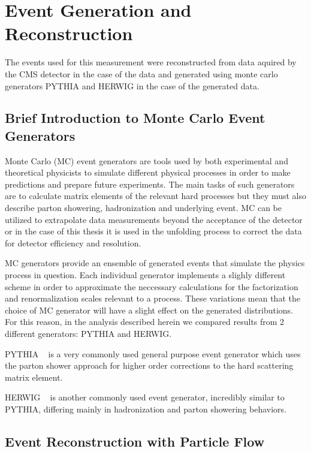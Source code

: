 \chapter{Event Generation and Reconstruction}\label{chap:MCGenReco}


The events used for this measurement were reconstructed from data aquired by the CMS detector in the case of the data and generated using monte carlo generators PYTHIA and HERWIG in the case of the generated data.

\section{Brief Introduction to Monte Carlo Event Generators}\label{secMCGen}

Monte Carlo (MC) event generators are tools used by both experimental and theoretical physicists to simulate different physical processes in order to make predictions and prepare future experiments. The main tasks of such generators are to calculate matrix elements of the relevant hard processes but they must also describe parton showering, hadronization and underlying event. MC can be utilized to extrapolate data measurements beyond the acceptance of the detector or in the case of this thesis it is used in the unfolding process to correct the data for detector efficiency and resolution.


MC generators provide an ensemble of generated events that simulate the physics process in question. Each individual generator implements a slighly different scheme in order to approximate the neccessary calculations for the factorization and renormalization scales relevant to a process. These variations mean that the choice of MC generator will have a slight effect on the generated distributions. For this reason, in the analysis described herein we compared results from 2 different generators: PYTHIA and HERWIG.

PYTHIA ~\cite{Sjostrand:2006za} is a very commonly used general purpose event generator which uses the parton shower approach for higher order corrections to the hard scattering matrix element.

HERWIG  ~\cite{herwigpp} is another commonly used event generator, incredibly similar to PYTHIA, differing mainly in hadronization and parton showering behaviors.


\section{Event Reconstruction with Particle Flow}\label{sec:PFReco}


